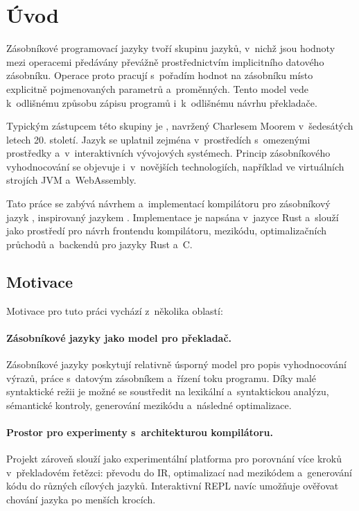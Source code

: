 \section{Úvod}
\label{sec:uvod}

Zásobníkové programovací jazyky tvoří skupinu jazyků, v~nichž jsou hodnoty
mezi operacemi předávány převážně prostřednictvím implicitního datového
zásobníku. Operace proto pracují s~pořadím hodnot na zásobníku místo
explicitně pojmenovaných parametrů a~proměnných. Tento model vede k~odlišnému
způsobu zápisu programů i~k~odlišnému návrhu překladače.

Typickým zástupcem této skupiny je \Forth{}, navržený Charlesem Moorem
v~šedesátých letech 20. století. Jazyk se uplatnil zejména v~prostředích
s~omezenými prostředky a~v~interaktivních vývojových systémech. Princip
zásobníkového vyhodnocování se objevuje i~v~novějších technologiích, například
ve virtuálních strojích JVM a~WebAssembly.

Tato práce se zabývá návrhem a~implementací kompilátoru pro zásobníkový jazyk
\Roth{}, inspirovaný jazykem \Forth{}. Implementace je napsána v~jazyce Rust
a~slouží jako prostředí pro návrh frontendu kompilátoru, mezikódu,
optimalizačních průchodů a~backendů pro jazyky Rust a~C.


\subsection{Motivace}
\label{sec:motivace}

Motivace pro tuto práci vychází z~několika oblastí:

\paragraph{Zásobníkové jazyky jako model pro překladač.}
Zásobníkové jazyky poskytují relativně úsporný model pro popis vyhodnocování
výrazů, práce s~datovým zásobníkem a~řízení toku programu. Díky malé syntaktické
režii je možné se soustředit na lexikální a~syntaktickou analýzu, sémantické
kontroly, generování mezikódu a~následné optimalizace.

\paragraph{Prostor pro experimenty s~architekturou kompilátoru.}
Projekt zároveň slouží jako experimentální platforma pro porovnání více kroků
v~překladovém řetězci: převodu do IR, optimalizací nad mezikódem a~generování
kódu do různých cílových jazyků. Interaktivní REPL navíc umožňuje ověřovat
chování jazyka po menších krocích.

